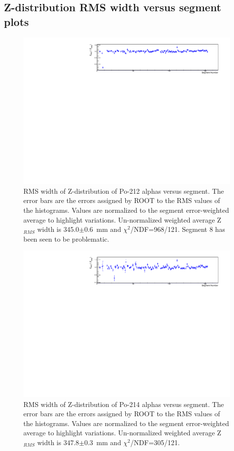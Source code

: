 \clearpage
\newpage
\subsection{Z-distribution RMS width versus segment plots}
\begin{figure}[!h]
\centering
\includegraphics[width=1.05\textwidth]{figures/PubBiPo212ZRMSvsCell.pdf}
\caption{\label{fig:ZRMSvsCell212}RMS width of Z-distribution of Po-212 alphas versus segment. The error bars are the errors assigned by ROOT to the RMS values of the histograms. Values are normalized to the segment error-weighted average to highlight variations. Un-normalized weighted average Z$_{RMS}$ width is 345.0$\pm$0.6~mm and $\chi^2$/NDF=968/121. Segment 8 has been seen to be problematic.}
\end{figure}
\begin{figure}[!h]
\centering
\includegraphics[width=1.05\textwidth]{figures/PubBiPo214ZRMSvsCell.pdf}
\caption{\label{fig:ZRMSvsCell214}RMS width of Z-distribution of Po-214 alphas versus segment. The error bars are the errors assigned by ROOT to the RMS values of the histograms. Values are normalized to the segment error-weighted average to highlight variations. Un-normalized weighted average Z$_{RMS}$ width is 347.8$\pm$0.3~mm and $\chi^2$/NDF=305/121.}
\end{figure}
\clearpage
\newpage
